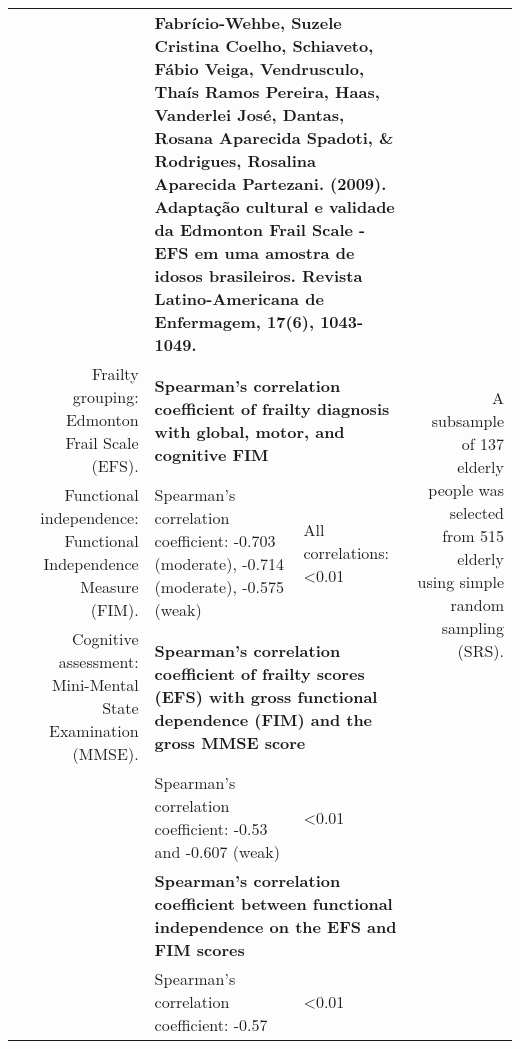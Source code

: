 \documentclass[jou]{apa6}
\begin{document}
\begin{table}[htbp]
\begin{tabular}{rrp{17.75em}p{20.7em}r}
    \rowcolor[rgb]{ .929,  .733,  .706} \multicolumn{1}{r}{\multirow{7}[0]{*}{\textit{\textbf{Functional independence}}}} &       & \multicolumn{2}{p{38.45em}}{\cellcolor[rgb]{ .745,  .749,  .894}\textbf{Fabrício-Wehbe, Suzele Cristina Coelho, Schiaveto, Fábio Veiga, Vendrusculo, Thaís Ramos Pereira, Haas, Vanderlei José, Dantas, Rosana Aparecida Spadoti, \& Rodrigues, Rosalina Aparecida Partezani. (2009). Adaptação cultural e validade da Edmonton Frail Scale - EFS em uma amostra de idosos brasileiros. Revista Latino-Americana de Enfermagem, 17(6), 1043-1049.}} & \multicolumn{1}{r}{\multirow{7}[0]{*}{A subsample of 137 elderly people was selected from 515 elderly using simple random sampling (SRS).}} \\
          & \multicolumn{1}{p{20.35em}}{\cellcolor[rgb]{ .929,  .733,  .706}Frailty grouping: Edmonton Frail Scale (EFS).} & \multicolumn{2}{p{38.45em}}{\cellcolor[rgb]{ .929,  .733,  .706}\textbf{Spearman's correlation coefficient of frailty diagnosis with global, motor, and cognitive FIM}} &  \\
          & \multicolumn{1}{p{20.35em}}{\cellcolor[rgb]{ .929,  .733,  .706}Functional independence: Functional Independence Measure (FIM).} & \cellcolor[rgb]{ .984,  .898,  .839}Spearman’s correlation coefficient: -0.703 (moderate), -0.714 (moderate), -0.575 (weak) & \cellcolor[rgb]{ .984,  .898,  .839}All correlations: <0.01 &  \\
          & \multicolumn{1}{p{20.35em}}{\cellcolor[rgb]{ .929,  .733,  .706}Cognitive assessment: Mini-Mental State Examination (MMSE).} & \multicolumn{2}{p{38.45em}}{\cellcolor[rgb]{ .929,  .733,  .706}\textbf{Spearman’s correlation coefficient of frailty scores (EFS) with gross functional dependence (FIM) and the gross MMSE score}} &  \\
          & \cellcolor[rgb]{ .929,  .733,  .706} & \cellcolor[rgb]{ .984,  .898,  .839}Spearman’s correlation coefficient: -0.53 and -0.607 (weak) & \multicolumn{1}{l}{\cellcolor[rgb]{ .984,  .898,  .839}<0.01} &  \\
          & \cellcolor[rgb]{ .929,  .733,  .706} & \multicolumn{2}{p{38.45em}}{\cellcolor[rgb]{ .929,  .733,  .706}\textbf{Spearman’s correlation coefficient between functional independence on the EFS and FIM scores}} &  \\
          & \cellcolor[rgb]{ .929,  .733,  .706} & \multicolumn{1}{l}{\cellcolor[rgb]{ .984,  .898,  .839}Spearman's correlation coefficient: -0.57} & \multicolumn{1}{l}{\cellcolor[rgb]{ .984,  .898,  .839}<0.01} &  \\

\end{tabular}
\end{table}
\end{document}
